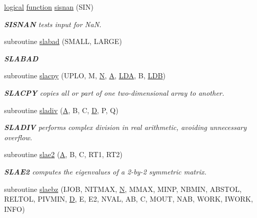 \begin{DoxyCompactItemize}
\hyperlink{tnc_8c_aa7b64cdf39500931f7b333343791a104}{logical} \hyperlink{afunc_8m_a7b5e596df91eadea6c537c0825e894a7}{function} \hyperlink{group__auxOTHERauxiliary_gaeca6bb0411af000e3c883ee744184991}{sisnan} (S\+I\+N)
\begin{DoxyCompactList}\small\item\em {\bfseries S\+I\+S\+N\+A\+N} tests input for Na\+N. \end{DoxyCompactList}\item 
subroutine \hyperlink{group__auxOTHERauxiliary_ga117e4564430a16335ad47054c447cb79}{slabad} (S\+M\+A\+L\+L, L\+A\+R\+G\+E)
\begin{DoxyCompactList}\small\item\em {\bfseries S\+L\+A\+B\+A\+D} \end{DoxyCompactList}\item 
subroutine \hyperlink{group__auxOTHERauxiliary_ga7780c991533ce8dd1f2c22ae2d563f08}{slacpy} (U\+P\+L\+O, M, \hyperlink{polmisc_8c_a0240ac851181b84ac374872dc5434ee4}{N}, \hyperlink{classA}{A}, \hyperlink{example__user_8c_ae946da542ce0db94dced19b2ecefd1aa}{L\+D\+A}, B, \hyperlink{example__user_8c_a50e90a7104df172b5a89a06c47fcca04}{L\+D\+B})
\begin{DoxyCompactList}\small\item\em {\bfseries S\+L\+A\+C\+P\+Y} copies all or part of one two-\/dimensional array to another. \end{DoxyCompactList}\item 
subroutine \hyperlink{group__auxOTHERauxiliary_ga774ef9659ab6074d1fd66eefc222085e}{sladiv} (\hyperlink{classA}{A}, B, C, \hyperlink{odrpack_8h_a7dae6ea403d00f3687f24a874e67d139}{D}, P, Q)
\begin{DoxyCompactList}\small\item\em {\bfseries S\+L\+A\+D\+I\+V} performs complex division in real arithmetic, avoiding unnecessary overflow. \end{DoxyCompactList}\item 
subroutine \hyperlink{group__auxOTHERauxiliary_gaec32dea47a14590934b8970b078b58fd}{slae2} (\hyperlink{classA}{A}, B, C, R\+T1, R\+T2)
\begin{DoxyCompactList}\small\item\em {\bfseries S\+L\+A\+E2} computes the eigenvalues of a 2-\/by-\/2 symmetric matrix. \end{DoxyCompactList}\item 
subroutine \hyperlink{group__auxOTHERauxiliary_ga4f5045e3ec268a759d36fec562d6e481}{slaebz} (I\+J\+O\+B, N\+I\+T\+M\+A\+X, \hyperlink{polmisc_8c_a0240ac851181b84ac374872dc5434ee4}{N}, M\+M\+A\+X, M\+I\+N\+P, N\+B\+M\+I\+N, A\+B\+S\+T\+O\+L, R\+E\+L\+T\+O\+L, P\+I\+V\+M\+I\+N, \hyperlink{odrpack_8h_a7dae6ea403d00f3687f24a874e67d139}{D}, E, E2, N\+V\+A\+L, A\+B, C, M\+O\+U\+T, N\+A\+B, W\+O\+R\+K, I\+W\+O\+R\+K, I\+N\+F\+O)

\end{DoxyCompactItemize}

